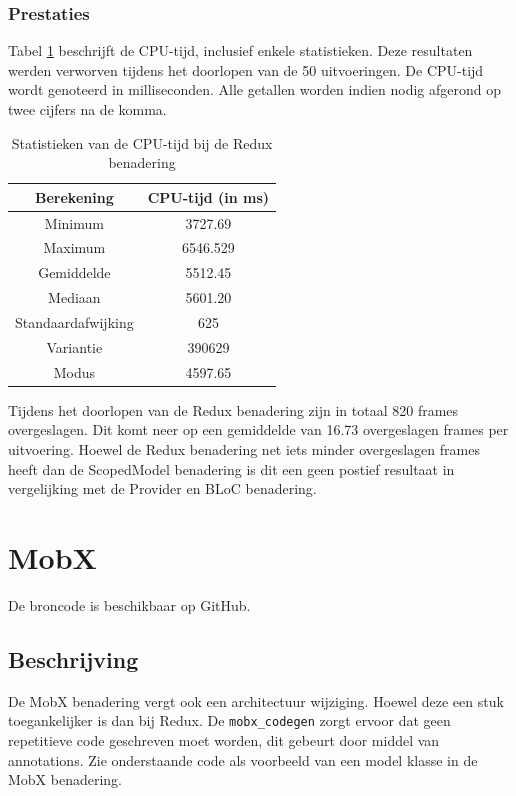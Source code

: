 \subsubsection{Prestaties}
Tabel \ref{table:experiment-redux-statistics} beschrijft de CPU-tijd, inclusief enkele statistieken. Deze resultaten werden verworven tijdens het doorlopen van de 50 uitvoeringen. De CPU-tijd wordt genoteerd in milliseconden. Alle getallen worden indien nodig afgerond op twee cijfers na de komma.
\begin{table}[H]
    \centering
    \begin{tabular}{c|c}
        \textbf{Berekening} & \textbf{CPU-tijd (in ms)} \\ \hline
        Minimum             & 3727.69                   \\ \hline
        Maximum             & 6546.529                  \\ \hline
        Gemiddelde          & 5512.45                   \\ \hline
        Mediaan             & 5601.20                   \\ \hline
        Standaardafwijking  & 625                       \\ \hline
        Variantie           & 390629                    \\ \hline
        Modus               & 4597.65                      \\                
    \end{tabular}
    \caption{Statistieken van de CPU-tijd bij de Redux benadering}
    \label{table:experiment-redux-statistics}
\end{table}

Tijdens het doorlopen van de Redux benadering zijn in totaal 820 frames overgeslagen. Dit komt neer op een gemiddelde van 16.73 overgeslagen frames per uitvoering. Hoewel de Redux benadering net iets minder overgeslagen frames heeft dan de ScopedModel benadering is dit een geen postief resultaat in vergelijking met de Provider en BLoC benadering.

\section{MobX}
De broncode is beschikbaar op GitHub. \autocite{DeVrient2019e}
\subsection{Beschrijving}
De MobX benadering vergt ook een architectuur wijziging. Hoewel deze een stuk toegankelijker is dan bij Redux. De \verb|mobx_codegen| zorgt ervoor dat geen repetitieve code geschreven moet worden, dit gebeurt door middel van annotations. Zie onderstaande code als voorbeeld van een model klasse in de MobX benadering.

